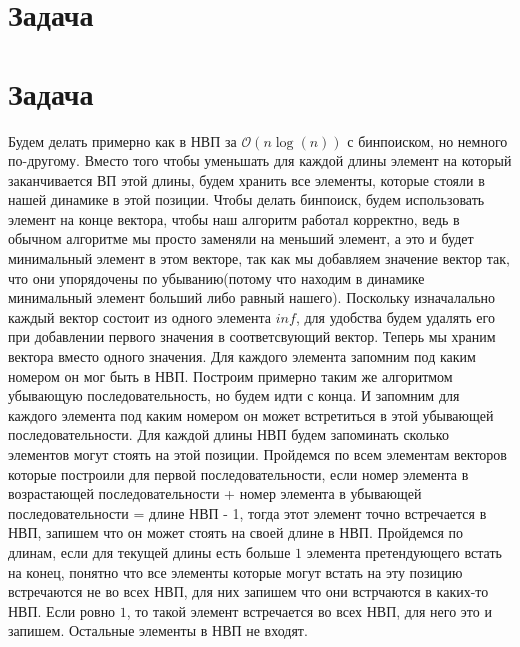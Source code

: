\documentclass{article}
\begin{document}
\section*{Задача }
\section*{Задача }
Будем делать примерно как в НВП за $\mathcal{O}(n\log(n))$ с бинпоиском, но немного по-другому. Вместо того чтобы уменьшать для каждой длины элемент на который заканчивается ВП этой длины, будем хранить все элементы, которые стояли в нашей динамике в этой позиции. 
\newline
Чтобы делать бинпоиск, будем использовать элемент на конце вектора, чтобы наш алгоритм работал корректно, ведь в обычном алгоритме мы просто заменяли на меньший элемент, а это и будет минимальный элемент в этом векторе, так как мы добавляем значение вектор так, что они упорядочены по убыванию(потому что находим в динамике минимальный элемент больший либо равный нашего). Поскольку изначалально каждый вектор состоит из одного элемента $inf$, для удобства будем удалять его при добавлении первого значения в соответсвующий вектор.
\newline
Теперь мы храним вектора вместо одного значения. Для каждого элемента запомним под каким номером он мог быть в НВП. 
\newline
Построим примерно таким же алгоритмом убывающую последовательность, но будем идти с конца. И запомним для каждого элемента под каким номером он может встретиться в этой убывающей последовательности.
Для каждой длины НВП будем запоминать сколько элементов могут стоять на этой позиции. Пройдемся по всем элементам векторов которые построили для первой последовательности, если номер элемента в возрастающей последовательности + номер элемента в убывающей последовательности = длине НВП - 1, тогда этот элемент точно встречается в НВП, запишем что он может стоять на своей длине в НВП. 
\newline
Пройдемся по длинам, если для текущей длины есть больше $1$ элемента претендующего встать на конец, понятно что все элементы которые могут встать на эту позицию встречаются не во всех НВП, для них запишем что они встрчаются в каких-то НВП. Если ровно $1$, то такой элемент встречается во всех НВП, для него это и запишем. 
Остальные элементы в НВП не входят.
\end{document}
